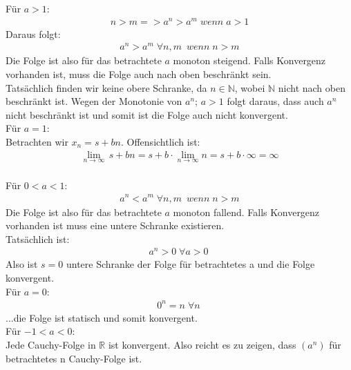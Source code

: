 \documentclass[a4paper,german,12pt,smallheadings]{scrartcl}
\begin{document}
Für $a>1$:
\begin{align*}
n>m=>a^n>a^m \;wenn\; a>1
\end{align*}
Daraus folgt:
\begin{align*}
a^n>a^m \; \forall n,m\ \;wenn\; n>m
\end{align*}
Die Folge ist also für das betrachtete $a$ monoton steigend. Falls Konvergenz vorhanden ist, muss die Folge auch nach oben beschränkt sein.\\
Tatsächlich finden wir keine obere Schranke, da $n \in \mathbb{N}$, wobei $\mathbb{N}$ nicht nach oben beschränkt ist. Wegen der Monotonie von $a^n$; $a>1$ folgt daraus, dass auch $a^n$ nicht beschränkt ist und somit ist die Folge auch nicht konvergent.\\

Für $a=1$:\\
Betrachten wir $x_n=s+bn$. Offensichtlich ist:
\begin{align*}
\lim_{n \to \infty}\,s+bn = s + b \cdot \lim_{n \to \infty} n = s +b \cdot \infty = \infty\\
\end{align*}

Für $0<a<1$:
\begin{align*}
a^n<a^m\;\forall n,m\ \;wenn\; n>m
\end{align*}
Die Folge ist also für das betrachtete $a$ monoton fallend. Falls Konvergenz vorhanden ist muss eine untere Schranke existieren.\\
Tatsächlich ist: 
\begin{align*}
a^n>0\;\forall a>0\
\end{align*}
Also ist $s=0$ untere Schranke der Folge für betrachtetes a und die Folge konvergent.\\

Für $a=0$:
\begin{align*}
0^n=n\;\forall n \
\end{align*}
...die Folge ist statisch und somit konvergent.\\

Für $-1<a<0$:\\
Jede Cauchy-Folge in $\mathbb{R}$ ist konvergent. Also reicht es zu zeigen, dass $(a^n)$ für betrachtetes n Cauchy-Folge ist.\\
\end{document}
